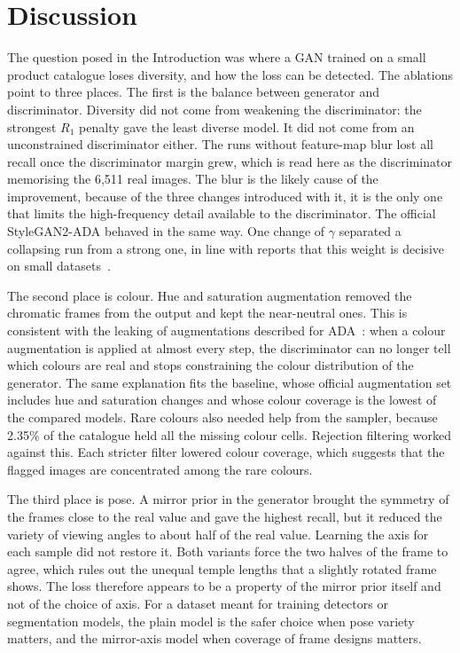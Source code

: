 \documentclass[electronics,article,submit,pdftex,moreauthors]{Definitions/mdpi}
\begin{document}
\section{Discussion}
\label{sec:discussion}

The question posed in the Introduction was where a GAN trained on a small
product catalogue loses diversity, and how the loss can be detected. The
ablations point to three places. The first is the balance between generator
and discriminator. Diversity did not come from weakening the discriminator:
the strongest $R_1$ penalty gave the least diverse model. It did not come
from an unconstrained discriminator either. The runs without feature-map
blur lost all recall once the discriminator margin grew, which is read here
as the discriminator memorising the 6,511 real images. The blur is the likely
cause of the improvement, because of the three changes introduced with it, it
is the only one that limits the high-frequency detail available to the
discriminator. The official StyleGAN2-ADA behaved in the same way. One change
of $\gamma$ separated a collapsing run from a strong one, in line with
reports that this weight is decisive on small
datasets~\cite{karras2020ada,mohanty2024rosacea}.

The second place is colour. Hue and saturation augmentation removed the
chromatic frames from the output and kept the near-neutral ones. This is
consistent with the leaking of augmentations described for
ADA~\cite{karras2020ada}: when a colour augmentation is applied at almost
every step, the discriminator can no longer tell which colours are real and
stops constraining the colour distribution of the generator. The same
explanation fits the baseline, whose official augmentation set includes hue
and saturation changes and whose colour coverage is the lowest of the
compared models. Rare colours also needed help from the sampler, because
2.35\% of the catalogue held all the missing colour cells. Rejection
filtering worked against this. Each stricter filter lowered colour coverage,
which suggests that the flagged images are concentrated among the rare
colours.

The third place is pose. A mirror prior in the generator brought the symmetry
of the frames close to the real value and gave the highest recall, but it
reduced the variety of viewing angles to about half of the real value.
Learning the axis for each sample did not restore it. Both variants force the
two halves of the frame to agree, which rules out the unequal temple lengths
that a slightly rotated frame shows. The loss therefore appears to be a
property of the mirror prior itself and not of the choice of axis. For a
dataset meant for training detectors or segmentation models, the plain model
is the safer choice when pose variety matters, and the mirror-axis model when
coverage of frame designs matters.
\end{document}
